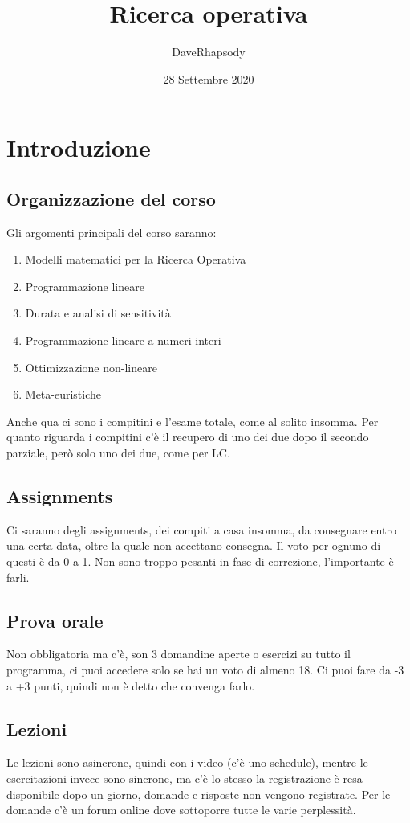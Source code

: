 \documentclass[12pt, a4paper, openany, twoside]{book}
\begin{document}
\selectfont
\pagestyle{plain}
\author{DaveRhapsody}
\title {Ricerca operativa}
\date {28 Settembre 2020}
\maketitle
\tableofcontents
\chapter{Introduzione}
\section{Organizzazione del corso}
Gli argomenti principali del corso saranno:
\begin{enumerate}
	\item Modelli matematici per la Ricerca Operativa
	\item Programmazione lineare
	\item Durata e analisi di sensitività
	\item Programmazione lineare a numeri interi
	\item Ottimizzazione non-lineare
	\item Meta-euristiche
\end{enumerate}
Anche qua ci sono i compitini e l'esame totale, come al solito insomma. Per quanto
riguarda i compitini c'è il recupero di uno dei due dopo il secondo parziale, 
però solo uno dei due, come per LC. 
\section{Assignments}
Ci saranno degli assignments, dei compiti a casa insomma, da consegnare entro 
una certa data, oltre la quale non accettano consegna. Il voto per ognuno di 
questi è da 0 a 1. Non sono troppo pesanti in fase di correzione, l'importante è
farli.
\section{Prova orale}
Non obbligatoria ma c'è, son 3 domandine aperte o esercizi su tutto il programma,
ci puoi accedere solo se hai un voto di almeno 18. Ci puoi fare da -3 a +3 punti,
quindi non è detto che convenga farlo.
\section{Lezioni}
Le lezioni sono asincrone, quindi con i video (c'è uno schedule), mentre le
esercitazioni invece sono sincrone, ma c'è lo stesso la registrazione è resa
disponibile dopo un giorno, domande e risposte non vengono registrate.
Per le domande c'è un forum online dove sottoporre tutte le varie perplessità. 
\end{document}
